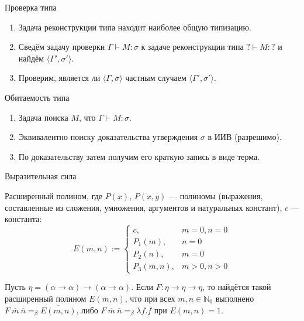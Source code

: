 \documentclass[aspectratio=169]{beamer}
\begin{document}
\begin{frame}{Проверка типа}
\begin{enumerate}
\item Задача реконструкции типа находит наиболее общую типизацию.
\item Сведём задачу проверки $\Gamma\vdash M:\sigma$ к задаче реконструкции типа $?\vdash M:?$ и найдём $\langle \Gamma', \sigma' \rangle$.
\item Проверим, является ли $\langle \Gamma, \sigma\rangle$ частным случаем $\langle \Gamma', \sigma' \rangle$.
\end{enumerate}
\end{frame}

\begin{frame}{Обитаемость типа}
\begin{enumerate}
\item Задача поиска $M$, что $\Gamma\vdash M:\sigma$.
\item Эквивалентно поиску доказательства утверждения $\sigma$ в ИИВ (разрешимо).
\item По доказательству затем получим его краткую запись в виде терма.
\end{enumerate}
\end{frame}

\begin{frame}{Выразительная сила}
\begin{dfn}
Расширенный полином, где $P(x)$, $P(x,y)$ --- полиномы (выражения, составленные из сложения, умножения, аргументов и натуральных констант),
$c$ --- константа:
$$E(m,n) := \left\{\begin{array}{ll}
c,& m = 0, n = 0\\
P_1(m), & n=0\\
P_2(n), & m=0\\
P_3(m,n), & m>0, n>0
\end{array}\right.$$
\end{dfn}

\begin{thm}
Пусть $\eta = (\alpha\rightarrow\alpha)\rightarrow(\alpha\rightarrow\alpha)$. 
Если $F: \eta\rightarrow\eta\rightarrow\eta$, то найдётся такой расширенный
полином $E(m,n)$, что при всех $m,n \in \mathbb{N}_0$ выполнено $F\ \overline{m}\ \overline{n} =_\beta \overline{E(m,n)}$, 
либо $F\ \overline{m}\ \overline{n} =_\beta \lambda f.f$ при $E(m,n) = 1$.
\end{thm}
\end{frame}
\end{document}
